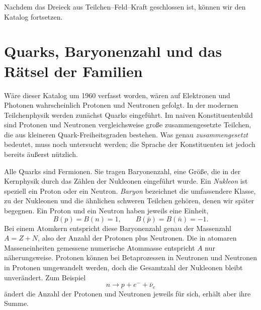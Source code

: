 Nachdem das Dreieck aus Teilchen--Feld--Kraft geschlossen ist, können wir den Katalog fortsetzen.

\section{Quarks, Baryonenzahl und das Rätsel der Familien}

Wäre dieser Katalog um 1960 verfasst worden, wären auf Elektronen und Photonen wahrscheinlich Protonen und Neutronen gefolgt. In der modernen Teilchenphysik werden zunächst Quarks eingeführt. Im naiven Konstituentenbild sind Protonen und Neutronen vergleichsweise große zusammengesetzte Teilchen, die aus kleineren Quark-Freiheitsgraden bestehen. Was genau \emph{zusammengesetzt} bedeutet, muss noch untersucht werden; die Sprache der Konstituenten ist jedoch bereits äußerst nützlich.

Alle Quarks sind Fermionen. Sie tragen Baryonenzahl, eine Größe, die in der Kernphysik durch das Zählen der Nukleonen eingeführt wurde. Ein \emph{Nukleon} ist speziell ein Proton oder ein Neutron. \emph{Baryon} bezeichnet die umfassendere Klasse, zu der Nukleonen und die ähnlichen schweren Teilchen gehören, denen wir später begegnen. Ein Proton und ein Neutron haben jeweils eine Einheit,
\begin{equation}
B(p)=B(n)=1,
\qquad
B(\bar p)=B(\bar n)=-1.
\end{equation}
Bei einem Atomkern entspricht diese Baryonenzahl genau der Massenzahl \(A=Z+N\), also der Anzahl der Protonen plus Neutronen. Die in atomaren Masseneinheiten gemessene numerische Atommasse entspricht \(A\) nur näherungsweise. Protonen können bei Betaprozessen in Neutronen und Neutronen in Protonen umgewandelt werden, doch die Gesamtzahl der Nukleonen bleibt unverändert. Zum Beispiel
\begin{equation}
n\longrightarrow p+e^-+\bar\nu_e
\end{equation}
ändert die Anzahl der Protonen und Neutronen jeweils für sich, erhält aber ihre Summe.

\begin{classroomqa}
\end{classroomqa}

